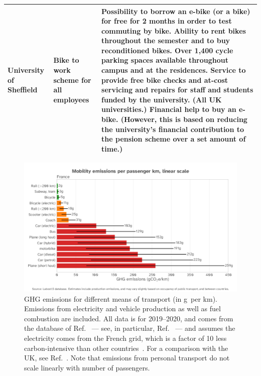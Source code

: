 \documentclass[../SustainableHEP.tex]{subfiles}
\begin{document}
\begin{table}
{\begin{tabular}{m{}m{}m{}}
    \midrule
University of Sheffield  &
    Bike to work scheme for all employees & Possibility to borrow an e-bike (or a bike) for free for 2 months in order to test commuting by bike.
    Ability to rent bikes throughout the semester and to buy reconditioned bikes. Over 1,400 cycle parking spaces available throughout campus and at the residences.
    Service to provide free bike checks and at-cost servicing and repairs for staff and students funded by the university.
    (All UK universities.) Financial help to buy an e-bike. (However, this is based on reducing the university's financial contribution to the pension scheme over a set amount of time.)~\cite{shefbike}
    \\
   \bottomrule
   
\end{tabular}}
\end{table}


\clearpage

\begin{figure}
    \centering
    \caption[Mobility emissions]{GHG emissions
for different means of transport (in g\CdOe\ per km).  Emissions from electricity and vehicle production as well as fuel combustion are included.  All data is for 2019--2020, and comes from the database of Ref.~\cite{labos1p5} --- see, in particular, Ref.~\cite{labos1p5emi} --- and assumes the electricity comes from the French grid, which is a factor of 10 less carbon-intensive than other countries~\cite{OWDintensity}.  For a comparison with the UK, see Ref.~\cite{OWIDtravel}. Note that emissions from personal transport do not scale linearly with number of passengers.
\label{fig:emiMobility}}
\includegraphics[width=\textwidth]{Sections/Figs/Travel/MobilityEmissionsLinear.png}
\end{figure}
\end{document}
